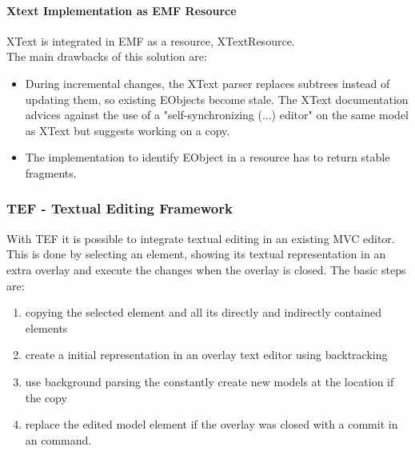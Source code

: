 \paragraph{Xtext Implementation as EMF  Resource}
XText is integrated in EMF as a resource, XTextResource.\\
The main drawbacks of this solution are:
\begin{itemize}
	\item During incremental changes, the XText parser replaces subtrees instead of updating them, so existing EObjects become stale. The XText documentation advices against the use of a "self-synchronizing (...) editor" on the same model as XText but suggests working on a copy.
	\item The implementation to identify EObject in a resource has to return stable fragments.
\end{itemize}


\subsubsection{TEF - Textual Editing Framework}
With TEF it is possible to integrate textual editing in an existing MVC editor. This is done by selecting an element, showing its textual representation in an extra overlay and execute the changes when the overlay is closed. 
The basic steps are:
\begin{enumerate}
	\item copying the selected element and all its directly and indirectly contained elements
	\item create a initial representation in an overlay text editor using backtracking
	\item use background parsing the constantly create new models at the location if the copy
	\item replace the edited model element if the overlay was closed with a commit in an command.
\end{enumerate}

